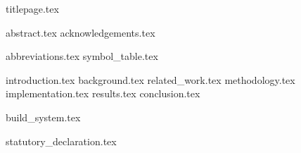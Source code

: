\documentclass[fleqn,10pt,twoside]{stdglobal}
\let\oldpagenumbering\pagenumbering
\renewcommand*\pagenumbering[1]{\cleardoublepage\oldpagenumbering{#1}}
\begin{document}

  {titlepage.tex}

  {abstract.tex}
  {acknowledgements.tex}

  \tableofcontents
  \listoffigures
  {abbreviations.tex}
  {symbol_table.tex}

  {introduction.tex}
  {background.tex}
  {related_work.tex}
  {methodology.tex}
  {implementation.tex}
  {results.tex}
  {conclusion.tex}
  \nocite{*}
  \printbibliography[heading=bibintoc,title=References]

  \appendix
  {build_system.tex}

  {statutory_declaration.tex}
\end{document}
